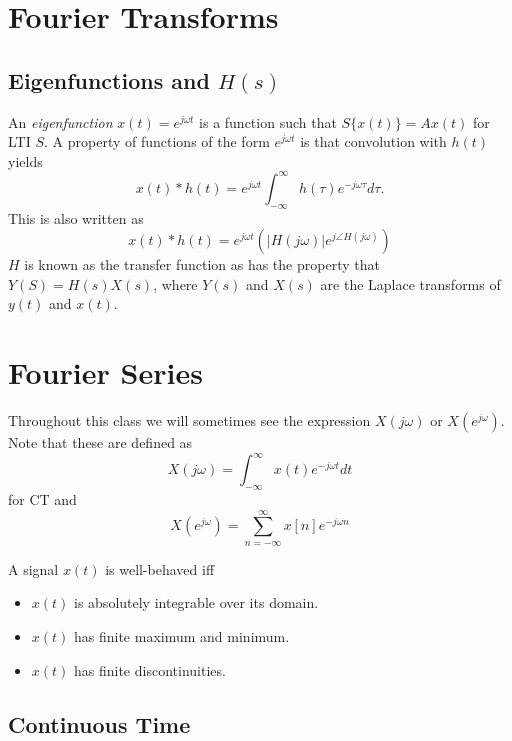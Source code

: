 \section{Fourier Transforms} \label{sec:fourier}

\subsection{Eigenfunctions and $H(s)$}

An \emph{eigenfunction} $x(t) = e^{j\omega t}$ is a function such that
$S\{x(t)\} = Ax(t)$ for LTI $S$. A property of functions of the form
$e^{j\omega t}$ is that convolution with $h(t)$ yields
\begin{equation}
    x(t) * h(t) = e^{j\omega t} \int_{-\infty}^{\infty} h(\tau) e^{-j\omega \tau} d\tau.
\end{equation}
This is also written as
\begin{equation}
    x(t) * h(t) = e^{j\omega t} \left( |H(j\omega)|e^{j \angle H(j\omega)} \right)
\end{equation}
$H$ is known as the transfer function as has the property that
$Y(S) = H(s)X(s)$, where $Y(s)$ and $X(s)$ are the Laplace transforms
of $y(t)$ and $x(t)$.

\section{Fourier Series}

Throughout this class we will sometimes see the expression $X(j\omega)$
or $X(e^{j\omega})$.
Note that these are defined as
\begin{equation}
    X(j\omega) = \int_{-\infty}^{\infty} x(t) e^{-j\omega t} dt
\end{equation}
for CT and
\begin{equation}
    X(e^{j\omega}) = \sum_{n=-\infty}^{\infty} x[n] e^{-j\omega n}
\end{equation}

A signal $x(t)$ is well-behaved iff
\begin{itemize}
    \item $x(t)$ is absolutely integrable over its domain.
    \item $x(t)$ has finite maximum and minimum.
    \item $x(t)$ has finite discontinuities.
\end{itemize}

\subsection{Continuous Time}

